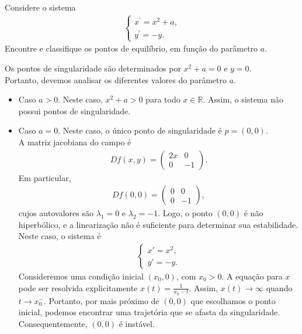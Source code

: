 \begin{homeworkProblem}[2]
  Considere o sistema
  \begin{align*}
    \begin{cases}
      x^{\prime}=x^2+a\text{,} \\
      y^{\prime}=-y.
    \end{cases}
  \end{align*}
  Encontre e classifique os pontos de equilíbrio, em função do parâmetro $a$.
  \begin{solution}
    Os pontos de singularidade são determinados por $x^2+a=0$ e $y=0$.\\
    Portanto, devemos analisar os diferentes valores do parâmetro $a$.
    \begin{itemize}
      \item Caso $a>0$.
        Neste caso, $x^2+a>0$ para todo $x\in\mathbb{R}$. Assim, o sistema não possui pontos de singularidade.
      \item Caso $a=0$.
        Neste caso, o único ponto de singularidade é $p=(0,0)$.\\
        A matriz jacobiana do campo é
        \begin{align*}
         Df(x,y)=\begin{pmatrix}
          2x & 0\\
          0 & -1
          \end{pmatrix}.
        \end{align*}
        Em particular,
        \begin{align*}
          Df(0,0)=\begin{pmatrix}
            0 & 0\\
            0 & -1
          \end{pmatrix},
        \end{align*}
        cujos autovalores são $\lambda_1=0$ e $\lambda_2=-1$. Logo, o ponto $(0,0)$ é não hiperbólico, e a linearização não é suficiente para determinar sua estabilidade.\\
        Neste caso, o sistema é
        \begin{align*}
          \begin{cases}
            x'=x^2,\\
            y'=-y.
          \end{cases}
        \end{align*}
        Consideremos uma condição inicial $(x_0,0)$, com $x_0>0$. A equação para $x$ pode ser resolvida explicitamente $x(t)=\frac{1}{x_0-t}$. Assim, $x(t)\to\infty$ quando $t\to x_0^{-}$. Portanto, por mais próximo de $(0,0)$ que escolhamos o ponto inicial, podemos encontrar uma trajetória que se afasta da singularidade. Consequentemente, $(0,0)$ é instável.\\

\end{itemize}
\end{solution}
\end{homeworkProblem}

